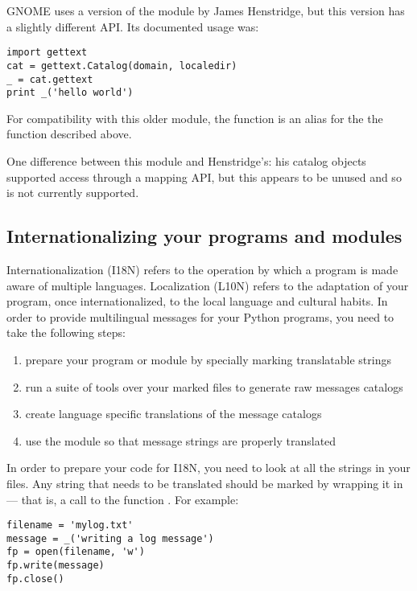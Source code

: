 GNOME uses a version of the  module by
James Henstridge, but this version has a slightly different API.  Its
documented usage was:

\begin{verbatim}
import gettext
cat = gettext.Catalog(domain, localedir)
_ = cat.gettext
print _('hello world')
\end{verbatim}

For compatibility with this older module, the function
 is an alias for the the 
function described above.

One difference between this module and Henstridge's: his catalog
objects supported access through a mapping API, but this appears to be
unused and so is not currently supported.

\subsection{Internationalizing your programs and modules}
Internationalization (I18N) refers to the operation by which a program
is made aware of multiple languages.  Localization (L10N) refers to
the adaptation of your program, once internationalized, to the local
language and cultural habits.  In order to provide multilingual
messages for your Python programs, you need to take the following
steps:

\begin{enumerate}
    \item prepare your program or module by specially marking
          translatable strings
    \item run a suite of tools over your marked files to generate raw
          messages catalogs
    \item create language specific translations of the message catalogs
    \item use the  module so that message strings are
          properly translated
\end{enumerate}

In order to prepare your code for I18N, you need to look at all the
strings in your files.  Any string that needs to be translated
should be marked by wrapping it in  --- that is, a call
to the function \function{_()}.  For example:

\begin{verbatim}
filename = 'mylog.txt'
message = _('writing a log message')
fp = open(filename, 'w')
fp.write(message)
fp.close()
\end{verbatim}

